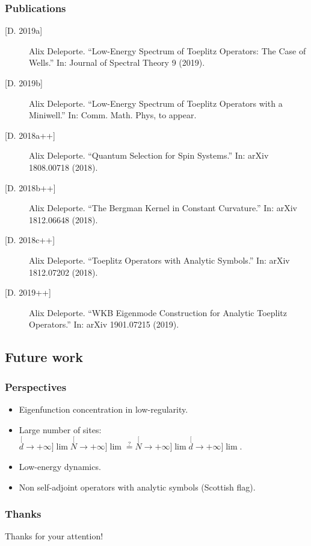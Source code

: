 \documentclass[mathserif]{beamer}
\begin{document}
     \begin{frame}
        \frametitle{Publications}
        {\footnotesize
        \begin{description}
        \item[{[D. 2019a]}] Alix Deleporte. “Low-Energy Spectrum of Toeplitz Operators: The Case
of Wells.” In: Journal of Spectral Theory 9 (2019).
\item[{[D. 2019b]}] Alix Deleporte. “Low-Energy Spectrum of Toeplitz Operators with a
Miniwell.” In: Comm. Math. Phys, to appear.
\item[{[D. 2018a++]}] Alix Deleporte. “Quantum Selection for Spin Systems.” In: arXiv
1808.00718 (2018).
\item[{[D. 2018b++]}] Alix Deleporte. “The Bergman Kernel in Constant Curvature.” In:
arXiv 1812.06648 (2018).
\item[{[D. 2018c++]}] Alix Deleporte. “Toeplitz Operators with Analytic Symbols.” In: arXiv
1812.07202 (2018).
\item[{[D. 2019++]}] Alix Deleporte. “WKB Eigenmode Construction for Analytic Toeplitz
  Operators.” In: arXiv 1901.07215 (2019).
        \end{description}}
      \end{frame}

\subsection{Future work}
\begin{frame}
  \frametitle{Perspectives}
    \begin{itemize}
    \item Eigenfunction concentration in low-regularity.
    \item Large number of sites: $\stackrel[d\to +\infty]{}{\lim}\stackrel[N\to +\infty]{}{\lim}\stackrel{?}{=}\stackrel[N\to +\infty]{}{\lim}\stackrel[d\to +\infty]{}{\lim}$.
    \item Low-energy dynamics.
    \item Non self-adjoint operators with analytic symbols (Scottish flag).
    \end{itemize}
  \end{frame}

  \begin{frame}
    \frametitle{Thanks}
    \centering 
    {\Large Thanks for your attention!}
  \end{frame}
  
\end{document}
